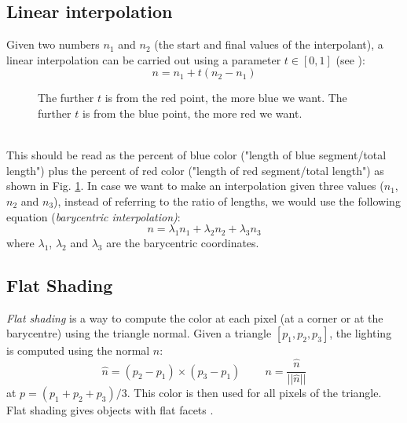 \subsection{Linear interpolation}\label{section:linear-interpolation}
Given two numbers $n_1$ and $n_2$ (the start and final values of the interpolant), a linear interpolation can be carried out using a parameter $t\in[0,1]$ (see \cite{WEBSITE:interpolation}):
$$ n = n_1 + t (n_2 - n_1)$$
\begin{figure}[!h]
  \centering
  \caption{The further $t$ is from the red point, the more blue we want. The further $t$ is from the blue point, the more red we want.}\label{figure:li-ratio}
\end{figure}
\\
This should be read as the percent of blue color ("length of blue segment/total length") plus the percent of red color ("length of red segment/total length") as shown in Fig. \ref{figure:li-ratio}. In case we want to make an interpolation given three values ($n_1$, $n_2$ and $n_3$), instead of referring to the ratio of lengths, we would use the following equation (\textit{barycentric interpolation)}:
$$ n = \lambda_1n_1 + \lambda_2n_2 + \lambda_3n_3$$
where $\lambda_1$, $\lambda_2$ and $\lambda_3$ are the barycentric coordinates.


\subsection{Flat Shading}
\textit{Flat shading} is a way to compute the color at each pixel (at a corner or at the barycentre) using the triangle normal.
Given a triangle $[p_1, p_2, p_3]$, the lighting is computed using the normal $n$: $$\widehat{n} = (p_2 - p_1) \times (p_3 - p_1) \;\;\;\;\;\;\;\; n = \frac{ \widehat{n} } { ||\widehat{n}|| } $$ at $p= (p_1 + p_2 + p_3)/3$. This color is then used for all pixels of the triangle. Flat shading gives objects with flat facets \cite{SLIDE:ICORSI}.

